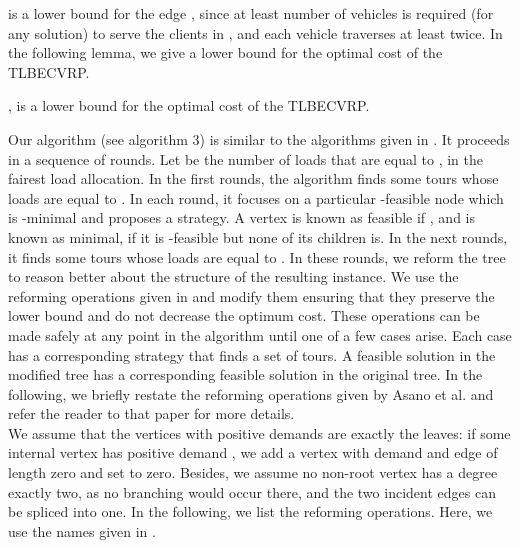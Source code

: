 \indent  is a lower bound for the edge , since at least  number of vehicles is required (for any solution) to serve the clients in , and each vehicle traverses  at least twice. In the following lemma, we give a lower bound for the optimal cost of the TLBECVRP.
\begin{lemma}
, is a lower bound for the optimal cost of the TLBECVRP.
\end{lemma}

\indent Our algorithm (see algorithm 3) is similar to the algorithms given in \cite{Asano2001,Hamaguchi,Naoki}. It proceeds in a sequence of rounds. Let  be the number of loads that are equal to , in the fairest load allocation. In the first  rounds, the algorithm finds some tours whose loads are equal to . In each round, it focuses on a particular -feasible node  which is -minimal and proposes a strategy. A vertex  is known as feasible if , and is known as minimal, if it is -feasible but none of its children is. In the next rounds, it finds some tours whose loads are equal to . In these rounds, we reform the tree to reason better about the structure of the resulting instance. We use the reforming operations given in \cite{Asano2001} and modify them ensuring that they preserve the lower bound and do not decrease the optimum cost. These operations can be made safely at any point in the algorithm until one of a few cases arise. Each case has a corresponding strategy that finds a set of tours. A feasible solution in the modified tree has a corresponding feasible solution in the original tree. In the following, we briefly restate the reforming operations given by Asano et al. \cite{Asano2001} and refer the reader to that paper for more details.\\
 \indent  We assume that the vertices with positive demands are exactly the leaves: if some internal vertex  has positive demand , we add a vertex  with demand  and edge  of length zero and set  to zero. Besides, we assume no non-root vertex has a degree exactly two, as no branching would occur there, and the two incident edges can be spliced into one. In the following, we list the reforming operations. Here, we use the names given in \cite{Becker}. 
